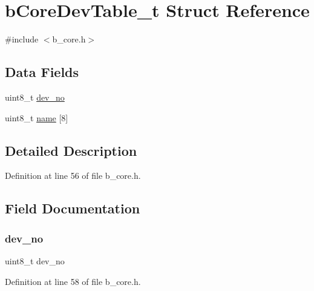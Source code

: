 \hypertarget{structb_core_dev_table__t}{}\section{b\+Core\+Dev\+Table\+\_\+t Struct Reference}
\label{structb_core_dev_table__t}


{\ttfamily \#include $<$b\+\_\+core.\+h$>$}

\subsection*{Data Fields}
\begin{DoxyCompactItemize}
\item 
uint8\+\_\+t \mbox{\hyperlink{structb_core_dev_table__t_a858e2685fb0034acadcd8d48cf6f02b2}{dev\+\_\+no}}
\item 
uint8\+\_\+t \mbox{\hyperlink{structb_core_dev_table__t_abfa8a0ef7b1321866a7c4099554fdfb0}{name}} \mbox{[}8\mbox{]}
\end{DoxyCompactItemize}


\subsection{Detailed Description}


Definition at line 56 of file b\+\_\+core.\+h.



\subsection{Field Documentation}
\mbox{\label{structb_core_dev_table__t_a858e2685fb0034acadcd8d48cf6f02b2}} 
\subsubsection{\texorpdfstring{dev\+\_\+no}{dev\_no}}
{\footnotesize\ttfamily uint8\+\_\+t dev\+\_\+no}



Definition at line 58 of file b\+\_\+core.\+h.

\mbox{\label{structb_core_dev_table__t_abfa8a0ef7b1321866a7c4099554fdfb0}} 
